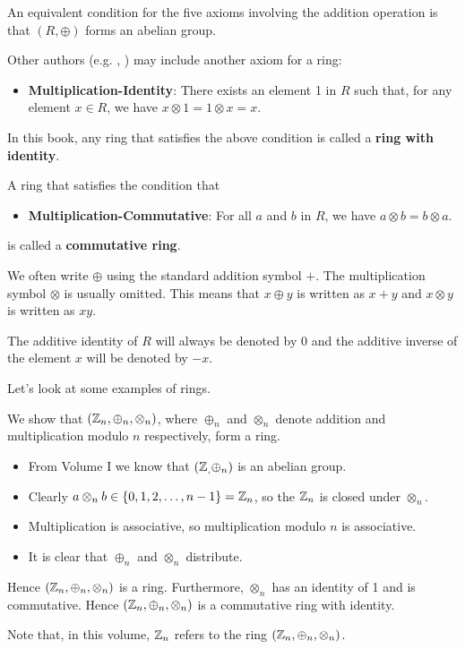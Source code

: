 \begin{remark}
    An equivalent condition for the five axioms involving the addition operation is that $(R, \oplus)$ forms an abelian group.
\end{remark}
\begin{remark}
    Other authors (e.g. \cite[p.~136]{cohn_1982}, \cite[pp.~145--146]{clark_1984}) may include another axiom for a ring:
    \begin{itemize}
        \item \textbf{Multiplication-Identity}: There exists an element 1 in $R$ such that, for any element $x \in R$, we have $x \otimes 1 = 1 \otimes x = x$.
    \end{itemize}
    In this book, any ring that satisfies the above condition is called a \textbf{ring with identity}.
\end{remark}
\begin{remark}
    A ring that satisfies the condition that
    \begin{itemize}
        \item \textbf{Multiplication-Commutative}: For all $a$ and $b$ in $R$, we have $a \otimes b = b \otimes a$.
    \end{itemize}
    is called a \textbf{commutative ring}.
\end{remark}

We often write $\oplus$ using the standard addition symbol $+$. The multiplication symbol $\otimes$ is usually omitted. This means that $x \oplus y$ is written as $x + y$ and $x \otimes y$ is written as $xy$.

The additive identity of $R$ will always be denoted by 0 and the additive inverse of the element $x$ will be denoted by $-x$.

Let's look at some examples of rings.
\begin{example}
    We show that $(\mathbb{Z}_{n}, \oplus_n, \otimes_n)$, where $\oplus_n$ and $\otimes_n$ denote addition and multiplication modulo $n$ respectively, form a ring.
    \begin{itemize}
        \item From Volume I we know that $(\mathbb{Z}_{,} \oplus_n)$ is an abelian group.
        \item Clearly $a \otimes_n b \in \{0, 1, 2, \dots, n-1\} = \mathbb{Z}_{n}$, so the $\mathbb{Z}_{n}$ is closed under $\otimes_n$.
        \item Multiplication is associative, so multiplication modulo $n$ is associative.
        \item It is clear that $\oplus_n$ and $\otimes_n$ distribute.
    \end{itemize}
    Hence $(\mathbb{Z}_{n}, \oplus_n, \otimes_n)$ is a ring. Furthermore, $\otimes_n$ has an identity of 1 and is commutative. Hence $(\mathbb{Z}_{n}, \oplus_n, \otimes_n)$ is a commutative ring with identity.

    Note that, in this volume, $\mathbb{Z}_{n}$ refers to the ring $(\mathbb{Z}_{n}, \oplus_n, \otimes_n)$.
\end{example}

